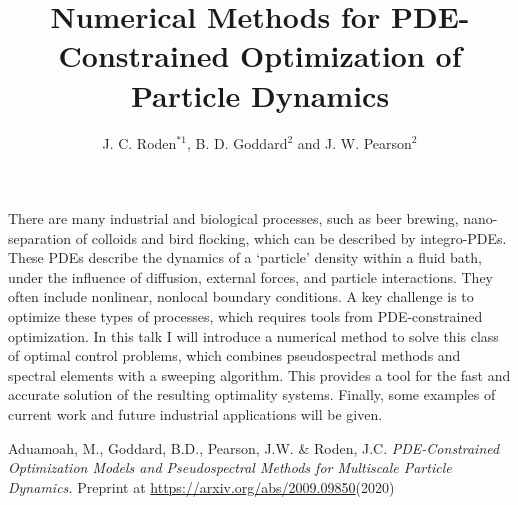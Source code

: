 \documentclass[a4paper]{abstract_style_ALOP_2020}
\title{Numerical Methods for PDE-Constrained Optimization of Particle Dynamics}
\author{J. C. Roden$^{*1}$, B. D. Goddard$^{2}$ and J. W. Pearson$^{2}$}
\begin{document}
There are many industrial and biological processes, such as beer brewing, nano-separation of colloids and bird flocking, which can be described by integro-PDEs. These PDEs describe the dynamics of a ‘particle’ density within a fluid bath, under the influence of diffusion, external forces, and particle interactions. They often include nonlinear, nonlocal boundary conditions. 
A key challenge is to optimize these types of processes, which requires tools from PDE-constrained optimization. In this talk I will introduce a numerical method to solve this class of optimal control problems, which combines pseudospectral methods and spectral elements with a sweeping algorithm. This provides a tool for the fast and accurate solution of the resulting optimality systems. Finally, some examples of current work and future industrial applications will be given. 

	

\begin{thebibliography}{99}	 \footnotesize
{} 	Aduamoah, M., Goddard, B.D., Pearson, J.W. \& Roden, J.C.\emph{ PDE-Constrained Optimization Models and Pseudospectral Methods for Multiscale Particle Dynamics.} Preprint at \url{https://arxiv.org/abs/2009.09850}(2020) 	
\end{thebibliography}
%
\end{document}
